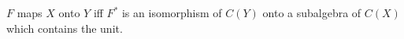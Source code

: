 $F$ maps $X$ onto $Y$ iff $F^*$ is an isomorphism of $C(Y)$ onto a subalgebra of $C(X)$ which contains the unit.
